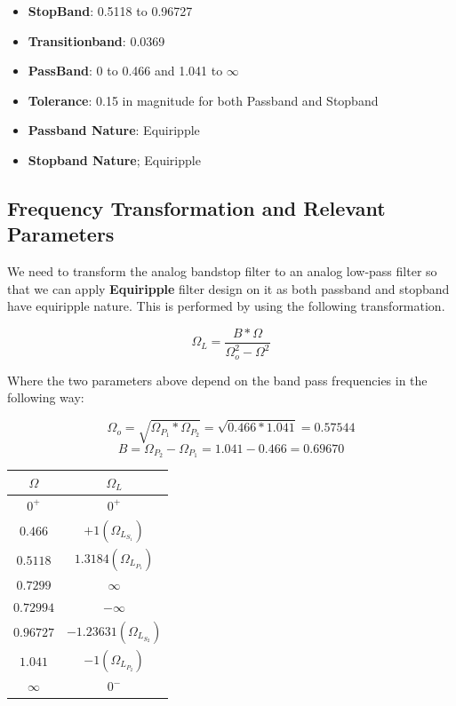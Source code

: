 \documentclass[12pt, letterpaper,]{article}
\begin{document}
\begin{itemize}

\item \textbf{StopBand}: 0.5118 to 0.96727

\item \textbf{Transitionband}: 0.0369

\item \textbf{PassBand}: 0 to 0.466 and 1.041 to $\infty$

\item \textbf{Tolerance}: 0.15 in magnitude for both Passband and Stopband

\item \textbf{Passband Nature}: Equiripple

\item \textbf{Stopband Nature}; Equiripple

\end{itemize}

\subsection{Frequency Transformation and Relevant Parameters}

We need to transform the analog bandstop filter to an analog low-pass filter so that we can apply \textbf{Equiripple} filter design on it as both passband and stopband have equiripple nature. This is performed by using the following transformation.

\begin{equation}
    \Omega_{L} = \frac{B*\Omega}{\Omega_{o}^2 - \Omega^2}
\end{equation}

Where the two parameters above depend on the band pass frequencies in the following way:

$$\Omega_{o} = \sqrt{\Omega_{P_1}*\Omega_{P_2}} = \sqrt{0.466 * 1.041} = 0.57544$$
$$ B = \Omega_{P_2} - \Omega_{P_1} = 1.041 - 0.466 = 0.69670$$

\begin{table}[!h]
    \centering

\begin{tabular}{|c|c|}
\hline
$\Omega$ & $\Omega_L$\\
\hline
$0^+$ & $0^+$ \\
$0.466$ &  $+1 (\Omega_{L_{S_1}})$\\
$0.5118$ & $1.3184 (\Omega_{L_{P_1}})$\\
$0.7299$ &  $\infty$\\
$0.72994$ &  $-\infty$\\
$0.96727$ & $-1.23631(\Omega_{L_{S_2}})$\\
$1.041$ & $-1 (\Omega_{L_{P_2}})$\\
$\infty$ & $0^-$ \\
\hline
\end{tabular}

\end{table}
\end{document}
